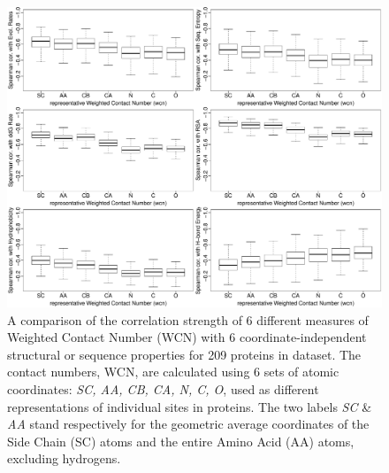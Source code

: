 \documentclass[11pt]{article}
\begin{document}
    \begin{figure}
        \begin{center}
        \includegraphics[width=5.5in]{best_wcn/select_variables/boxplot_wcn_all_in_one.pdf}
        \end{center}
        \caption{A comparison of the correlation strength of 6 different measures of Weighted Contact Number (WCN) with 6 coordinate-independent structural or sequence properties for 209 proteins in dataset. The contact numbers, WCN, are calculated using 6 sets of atomic coordinates: {\it SC, AA, CB, CA, N, C, O}, used as different representations of individual sites in proteins. The two labels {\it SC} \& {\it AA} stand respectively for the geometric average coordinates of the Side Chain (SC) atoms and the entire Amino Acid (AA) atoms, excluding hydrogens.}
        \label{fig:best_wcn}
    \end{figure}
\end{document}
